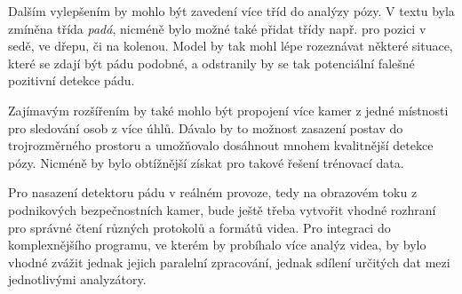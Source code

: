 Dalším vylepšením by mohlo být zavedení více tříd do analýzy pózy. V textu byla
zmíněna třída \textit{padá}, nicméně bylo možné také přidat třídy např. pro
pozici v sedě, ve dřepu, či na kolenou. Model by tak mohl lépe rozeznávat
některé situace, které se zdají být pádu podobné, a  odstranily by se tak
potenciální falešné pozitivní detekce pádu.

Zajímavým rozšířením by také mohlo být propojení více kamer z jedné místnosti
pro sledování osob z více úhlů. Dávalo by to možnost zasazení postav do
trojrozměrného prostoru a umožňovalo dosáhnout mnohem kvalitnější detekce pózy.
Nicméně by bylo obtížnější získat pro takové řešení trénovací data.

Pro nasazení detektoru pádu v reálném provoze, tedy na obrazovém toku z
podnikových bezpečnostních kamer, bude ještě třeba vytvořit vhodné rozhraní pro
správné čtení různých protokolů a formátů videa. Pro integraci do
komplexnějšího programu, ve kterém by probíhalo více analýz videa, by bylo
vhodné zvážit jednak jejich paralelní zpracování, jednak sdílení určitých dat
mezi jednotlivými analyzátory.

\endinput
